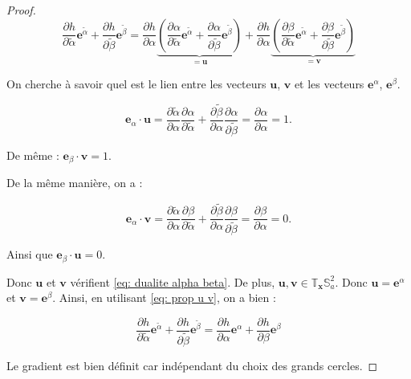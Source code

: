 \begin{proof}
\begin{equation}
\dfrac{\partial h}{\partial \tilde{\alpha}} \mathbf{e}^{\tilde{\alpha}} + \dfrac{\partial h}{\partial \tilde{\beta}} \mathbf{e}^{\tilde{\beta}} = \dfrac{\partial h}{\partial \alpha}  \underbrace{\left( \dfrac{\partial \alpha}{\partial \tilde{\alpha}} \mathbf{e}^{\tilde{\alpha}} + \dfrac{\partial \alpha}{\partial \tilde{\beta}} \mathbf{e}^{\tilde{\beta}}  \right)} _{=\mathbf{u}} + \dfrac{\partial h}{\partial \alpha}  \underbrace{\left( \dfrac{\partial \beta}{\partial \tilde{\alpha}} \mathbf{e}^{\tilde{\alpha}} + \dfrac{\partial \beta}{\partial \tilde{\beta}} \mathbf{e}^{\tilde{\beta}} \right)}_{= \mathbf{v}} 
\label{eq: prop u v}
\end{equation}

On cherche à savoir quel est le lien entre les vecteurs $\mathbf{u}$, $\mathbf{v}$ et les vecteurs $\mathbf{e}^{\alpha}$, $\mathbf{e}^{\beta}$.

\begin{equation}
\mathbf{e}_{\alpha} \cdot \mathbf{u} = \dfrac{\partial \tilde{\alpha}}{\partial \alpha} \dfrac{\partial \alpha}{\partial \tilde{\alpha}} + \dfrac{\partial \tilde{\beta}}{\partial \alpha} \dfrac{\partial \alpha}{\partial \tilde{\beta}} = \dfrac{\partial \alpha}{\partial \alpha} = 1.
\end{equation}

De même : $\mathbf{e}_{\beta} \cdot \mathbf{v} = 1$.

De la même manière, on a :

\begin{equation}
\mathbf{e}_{\alpha} \cdot \mathbf{v} = \dfrac{\partial \tilde{\alpha}}{\partial \alpha} \dfrac{\partial \beta}{\partial \tilde{\alpha}} + \dfrac{\partial \tilde{\beta}}{\partial \alpha} \dfrac{\partial \beta}{\partial \tilde{\beta}} = \dfrac{\partial \beta}{\partial \alpha} = 0.
\end{equation}

Ainsi que $\mathbf{e}_{\beta} \cdot \mathbf{u} = 0$.

Donc $\mathbf{u}$ et $\mathbf{v}$ vérifient \eqref{eq: dualite alpha beta}. De plus, $\mathbf{u}, \mathbf{v} \in \mathbb{T}_{\mathbf{x}} \mathbb{S}_a^2$. Donc $\mathbf{u} = \mathbf{e}^{\alpha}$ et $\mathbf{v} = \mathbf{e}^{\beta}$. Ainsi, en utilisant \eqref{eq: prop u v}, on a bien :

\begin{equation}
\dfrac{\partial h}{\partial \tilde{\alpha}} \mathbf{e}^{\tilde{\alpha}} + \dfrac{\partial h}{\partial \tilde{\beta}} \mathbf{e}^{\tilde{\beta}} = \dfrac{\partial h}{\partial \alpha} \mathbf{e}^{\alpha} + \dfrac{\partial h}{\partial \beta} \mathbf{e}^{\beta}
\end{equation}

Le gradient est bien définit car indépendant du choix des grands cercles.
\end{proof}

